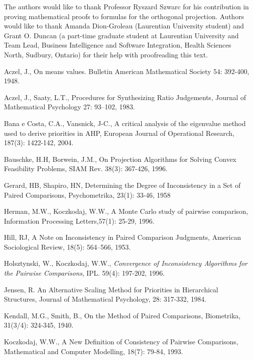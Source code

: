 \documentclass [12pt]{article}
\theoremstyle{definition}
\begin{document}
The authors would like to thank Professor Ryszard Szwarc for his contribution in proving mathematical proofs to formulas for the orthogonal projection. Authors would like to thank Amanda Dion-Groleau (Laurentian University student) and Grant O. Duncan (a part-time graduate student at Laurentian University and Team Lead, Business Intelligence and Software Integration, Health Sciences North, Sudbury, Ontario) for their help with proofreading this text.


\begin{thebibliography}{9}


Aczel, J.,
On means values. Bulletin American Mathematical Society 54: 392-400, 1948.

Aczel, J., Saaty, L.T.,
Procedures for Synthesizing Ratio Judgements,
Journal of Mathematical Psychology 27: 93--102, 1983.

Bana e Costa, C.A., Vansnick, J-C., 
A critical analysis of the eigenvalue method used to derive priorities in AHP,
European Journal of Operational Research, 187(3): 1422-142, 2004.


Bauschke, H.H, Borwein, J.M.,  On Projection Algorithms for Solving Convex Feasibility Problems, SIAM Rev. 38(3): 367-426, 1996.


Gerard, HB, Shapiro, HN, Determining the Degree of Inconsistency in a Set of Paired Comparisons, Psychometrika,  23(1): 33-46, 1958

Herman, M.W., Koczkodaj, W.W.,
A Monte Carlo study of pairwise comparison,
Information Processing Letters,57(1): 25-29, 1996.

Hill, RJ, A Note on Inconsistency in Paired Comparison Judgments,
American Sociological Review, 18(5): 564--566, 1953.

Holsztynski, W., Koczkodaj, W.W., \emph{Convergence of Inconsistency
Algorithms for the Pairwise Comparisons}, IPL. 59(4): 197-202, 1996.

Jensen, R. An Alternative Scaling Method for Priorities in Hierarchical Structures,
Journal of Mathematical Psychology, 28: 317-332, 1984.

Kendall, M.G., Smith, B., On the Method of Paired Comparisons,
Biometrika, 31(3/4): 324-345, 1940.

Koczkodaj, W.W., A New Definition of Consistency of Pairwise Comparisons, 
Mathematical and Computer Modelling, 18(7): 79-84, 1993.


\end{thebibliography}
\end{document}
